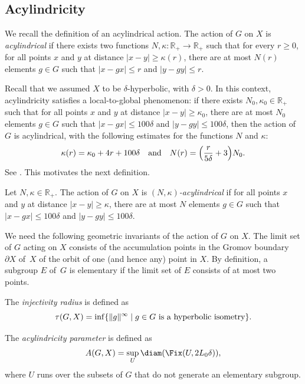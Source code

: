 \subsection{Acylindricity} We recall the definition of an acylindrical action.
The action of $G$ on $X$ is \emph{acylindrical} if there exists two functions $N,\kappa \colon \mathbb R_+ \to \mathbb R_+$ such that for every $r \geq 0$, for all points $x$ and $y$ at distance $|x-y|\geqslant \kappa(r)$, there are at most $N(r)$ elements $g\in G$ such that $|x-gx|\leqslant r$ and $|y-gy|\leqslant r$.

Recall that we assumed $X$ to be $\delta$-hyperbolic, with $\delta > 0$.
In this context, acylindricity satisfies a local-to-global phenomenon: if there exists $N_0,\kappa_0 \in \mathbb R_+$ such that for all points $x$ and $y$ at distance $|x-y|\geqslant \kappa_0$, there are at most $N_0$ elements $g\in G$ such that $|x-gx|\leqslant 100\delta$ and $|y-gy|\leqslant 100\delta$, then the action of $G$ is acylindrical, with the following estimates for the functions $N$ and $\kappa$:
\begin{equation}
\label{eqn: local-global acyl}
\kappa(r) = \kappa_0 + 4r + 100\delta
\quad \text{and} \quad
N(r) = \Bigl( \frac r{5\delta} + 3\Bigr)N_0.
\end{equation}
See \cite[Prop.\,5.31]{dahmani_hyperbolically_2017}.
This motivates the next definition.

\begin{df}\label{D: acylindrical}
Let $N, \kappa \in \mathbb R_+$.
The action of $G$ on $X$ is \emph{$(N,\kappa)$-acylindrical} if for all points $x$ and $y$ at distance $|x-y|\geqslant \kappa$, there are at most $N$ elements $g\in G$ such that $|x-gx|\leqslant 100 \delta$ and $|y-gy|\leqslant 100 \delta$.
\end{df}

We need the following geometric invariants of the action of $G$ on $X$.
The limit set of $G$ acting on $X$ consists of the accumulation points in the Gromov boundary $\partial X$ of~$X$ of the orbit of one (and hence any) point in $X$. By definition, a subgroup $E$ of~$G$ is {elementary} if the limit set of $E$ consists of at most two points.

\begin{df} The \emph{injectivity radius} is defined as
\[
\tau(G,X)=\inf \{\| g \|^{\infty} \mid g \in G \hbox{ is a hyperbolic isometry}\}.
\]
\end{df}

\begin{df} The \emph{acylindricity parameter} is defined as
\[
A(G,X)=\sup_{U} \diam( \Fix(U,2L_0\delta)),
\]
where $U$ runs over the subsets of $G$ that do not generate an elementary subgroup.
\end{df}

